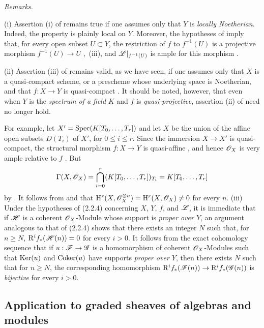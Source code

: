 \begin{env}[2.2.5]
\label{III.2.2.5}
\emph{Remarks.}

(i) Assertion (i) of  remains true if one assumes only that $Y$ is \emph{locally Noetherian}.
Indeed, the property is plainly local on $Y$.
Moreover, the hypotheses of  imply that, for every open subset $U\subset Y$, the restriction of $f$ to $f^{-1}(U)$ is a projective morphism $f^{-1}(U)\longrightarrow U$
,~(iii), and $\mathscr{L}|_{f^{-1}(U)}$ is ample for this morphism .

(ii) Assertion (iii) of  remains valid, as we have seen, if one assumes only that $X$ is a quasi-compact scheme, or a prescheme whose underlying space is Noetherian, and that $f:X\to Y$ is quasi-compact .
It should be noted, however, that even when $Y$ is the \emph{spectrum of a field} $K$ and $f$ is \emph{quasi-projective}, assertion (ii) of  need no longer hold.

For example, let $X'=\operatorname{Spec}(K[T_0,\ldots,T_r])$
and let $X$ be the union of the affine open subsets $D(T_i)$ of $X'$, for $0\leq i\leq r$.
Since the immersion $X\to X'$ is quasi-compact, the structural morphism $f:X\to Y$ is quasi-affine , and hence $\mathscr{O}_X$ is very ample relative to $f$ .
But
\[
  \Gamma(X,\mathscr{O}_X)
  =\bigcap_{i=0}^r(K[T_0,\ldots,T_r])_{T_i}
  =K[T_0,\ldots,T_r]
\]
by .
It follows from  and  that $\mathrm{H}^r(X,\mathscr{O}_X^{\otimes n})
=\mathrm{H}^r(X,\mathscr{O}_X)
\neq0$
for every $n$.
(iii) Under the hypotheses of (2.2.4) concerning $X$, $Y$, $f$, and $\mathscr{L}$,
it is immediate that if $\mathscr{H}$ is a coherent $\mathscr{O}_X$-Module whose support
is \emph{proper over $Y$}, an argument analogous to that of (2.2.4) shows
that there exists an integer $N$ such that, for $n\geq N$,
$\mathrm{R}^if_*(\mathscr{H}(n))=0$ for every $i>0$. It follows from the exact
cohomology sequence that if $u:\mathscr{F}\to\mathscr{G}$ is a homomorphism of coherent
$\mathscr{O}_X$-Modules such that $\operatorname{Ker}(u)$ and $\operatorname{Coker}(u)$ have supports
\emph{proper over $Y$}, then there exists $N$ such that for $n\geq N$, the
corresponding homomorphism
$\mathrm{R}^if_*(\mathscr{F}(n))\to\mathrm{R}^if_*(\mathscr{G}(n))$ is \emph{bijective} for every
$i>0$.
\end{env}


\subsection{Application to graded sheaves of algebras and modules}
\label{subsection:III.2.3}

